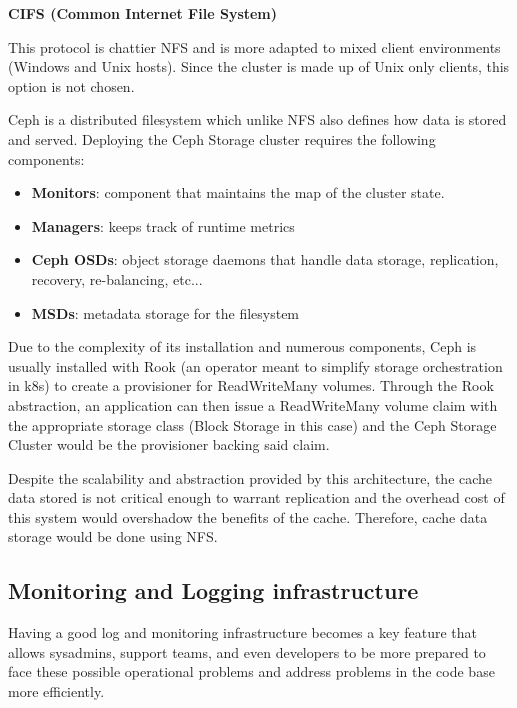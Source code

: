 \documentclass[11pt]{article}
\begin{document}
\vspace{5mm}
\textbf{CIFS (Common Internet File System)}

This protocol is chattier NFS and is more adapted to mixed client environments (Windows and Unix hosts). Since the cluster is made up of Unix only clients, this option is not chosen.


\vspace{-5mm}\hspace{5mm} Ceph is a distributed filesystem which unlike NFS also defines how data is stored and served. Deploying the Ceph Storage cluster requires the following components:
\begin{itemize}
    \item \textbf{Monitors}: component that maintains the map of the cluster state.
    \item \textbf{Managers}: keeps track of runtime metrics
    \item \textbf{Ceph OSDs}: object storage daemons that handle data storage, replication, recovery, re-balancing, etc...
    \item \textbf{MSDs}: metadata storage for the filesystem 
\end{itemize}

Due to the complexity of its installation and numerous components, Ceph is usually installed with Rook (an operator meant to simplify storage orchestration in k8s) to create a provisioner for ReadWriteMany volumes. Through the Rook abstraction, an application can then issue a ReadWriteMany volume claim with the appropriate storage class (Block Storage in this case) and the Ceph Storage Cluster would be the provisioner backing said claim.

Despite the scalability and abstraction provided by this architecture, the cache data stored is not critical enough to warrant replication and the overhead cost of this system would overshadow the benefits of the cache. Therefore, cache data storage would be done using NFS.

\subsection{Monitoring and Logging infrastructure}

\hspace{5mm} Having a good log and monitoring infrastructure becomes a key feature that allows sysadmins, support teams, and even developers to be more prepared to face these possible operational problems and address problems in the code base more efficiently. 
\end{document}
